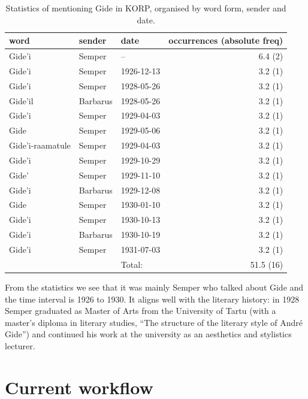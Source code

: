 \documentclass[runningheads]{llncs}
\begin{document}
\begin{table}
\caption{Statistics of mentioning Gide in KORP, organised by word form, sender and date.}\label{tab1}
\begin{tabular}{| l | l | l | r|}
  \hline
  word & sender & date & occurrences (absolute freq) \\
  \hline
  Gide'i & Semper & -- & 6.4 (2)\\
  Gide'i & Semper & 1926-12-13 & 3.2 (1)\\
  Gide'i & Semper & 1928-05-26 & 3.2 (1)\\
  Gide'il & Barbarus & 1928-05-26 & 3.2 (1)\\
  Gide'i & Semper & 1929-04-03 & 3.2 (1)\\
  Gide & Semper & 1929-05-06 & 3.2 (1)\\
  Gide'i-raamatule & Semper & 1929-04-03 & 3.2 (1)\\
  Gide'i & Semper & 1929-10-29 & 3.2 (1)\\
  Gide' & Semper & 1929-11-10 & 3.2 (1)\\
  Gide'i & Barbarus & 1929-12-08 & 3.2 (1)\\
  Gide & Semper & 1930-01-10 & 3.2 (1)\\
  Gide'i & Semper & 1930-10-13 & 3.2 (1)\\
  Gide'i & Barbarus & 1930-10-19 & 3.2 (1)\\
  Gide'i & Semper & 1931-07-03 & 3.2 (1)\\
  \hline
  &&Total:&51.5 (16)\\
\hline
\end{tabular}
\end{table}


From the statistics we see that it was mainly Semper who talked about Gide and the time interval is 1926 to 1930. It aligns well with the literary history: in 1928 Semper graduated as Master of Arts from the University of Tartu (with a master’s diploma in literary studies, ``The structure of the literary style of Andr\'e Gide'') and continued his work at the university as an aesthetics and stylistics lecturer.

\section{Current workflow}
\end{document}
